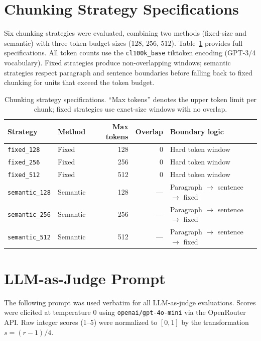 \documentclass[12pt]{article}
\begin{document}
\section{Chunking Strategy Specifications}
\label{app:chunking}

Six chunking strategies were evaluated, combining two methods (fixed-size and
semantic) with three token-budget sizes (128, 256, 512). Table~\ref{tab:chunking}
provides full specifications. All token counts use the \texttt{cl100k\_base}
tiktoken encoding (GPT-3/4 vocabulary). Fixed strategies produce non-overlapping
windows; semantic strategies respect paragraph and sentence boundaries before
falling back to fixed chunking for units that exceed the token budget.

\begin{table}[h]
\centering
\caption{Chunking strategy specifications. ``Max tokens'' denotes the upper token
limit per chunk; fixed strategies use exact-size windows with no overlap.}
\label{tab:chunking}
\begin{tabular}{llrrl}
\toprule
\textbf{Strategy} & \textbf{Method} & \textbf{Max tokens} & \textbf{Overlap} & \textbf{Boundary logic} \\
\midrule
\texttt{fixed\_128}    & Fixed    & 128 & 0   & Hard token window \\
\texttt{fixed\_256}    & Fixed    & 256 & 0   & Hard token window \\
\texttt{fixed\_512}    & Fixed    & 512 & 0   & Hard token window \\
\texttt{semantic\_128} & Semantic & 128 & --- & Paragraph $\to$ sentence $\to$ fixed \\
\texttt{semantic\_256} & Semantic & 256 & --- & Paragraph $\to$ sentence $\to$ fixed \\
\texttt{semantic\_512} & Semantic & 512 & --- & Paragraph $\to$ sentence $\to$ fixed \\
\bottomrule
\end{tabular}
\end{table}

\section{LLM-as-Judge Prompt}
\label{app:judge_prompt}

The following prompt was used verbatim for all LLM-as-judge evaluations.
Scores were elicited at temperature 0 using \texttt{openai/gpt-4o-mini} via
the OpenRouter API. Raw integer scores (1--5) were normalized to $[0, 1]$ by
the transformation $s = (r - 1) / 4$.
\end{document}

